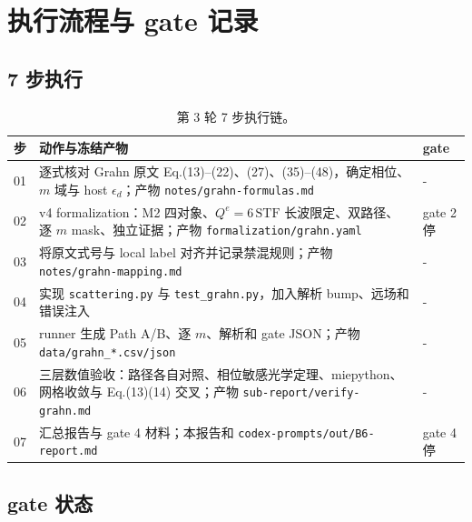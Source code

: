 \section{执行流程与 gate 记录}

\subsection{7 步执行}

\begin{table}[H]
\centering\small
\begin{tabularx}{\textwidth}{cXl}
\toprule
步 & 动作与冻结产物 & gate \\
\midrule
01 & 逐式核对 Grahn 原文 Eq.(13)--(22)、(27)、(35)--(48)，确定相位、$m$ 域与 host $\epsilon_d$；产物 \texttt{notes/grahn-formulas.md} & - \\
02 & v4 formalization：M2 四对象、$Q^e=6\,\mathrm{STF}$ 长波限定、双路径、逐 $m$ mask、独立证据；产物 \texttt{formalization/grahn.yaml} & gate 2 停 \\
03 & 将原文式号与 local label 对齐并记录禁混规则；产物 \texttt{notes/grahn-mapping.md} & - \\
04 & 实现 \texttt{scattering.py} 与 \texttt{test\_grahn.py}，加入解析 bump、远场和错误注入 & - \\
05 & runner 生成 Path A/B、逐 $m$、解析和 gate JSON；产物 \texttt{data/grahn\_*.csv/json} & - \\
06 & 三层数值验收：路径各自对照、相位敏感光学定理、miepython、网格收敛与 Eq.(13)(14) 交叉；产物 \texttt{sub-report/verify-grahn.md} & - \\
07 & 汇总报告与 gate 4 材料；本报告和 \texttt{codex-prompts/out/B6-report.md} & gate 4 停 \\
\bottomrule
\end{tabularx}
\caption{第 3 轮 7 步执行链。}
\end{table}

\subsection{gate 状态}

